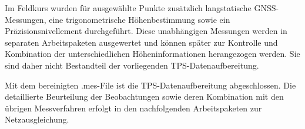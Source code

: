 Im Feldkurs wurden für ausgewählte Punkte zusätzlich langstatische
GNSS-Messungen, eine trigonometrische Höhenbestimmung sowie ein
Präzisionsnivellement durchgeführt. Diese unabhängigen Messungen werden
in separaten Arbeitspaketen ausgewertet und können später zur Kontrolle
und Kombination der unterschiedlichen Höheninformationen herangezogen
werden. Sie sind daher nicht Bestandteil der vorliegenden
TPS-Datenaufbereitung.

Mit dem bereinigten .mes-File ist die TPS-Datenaufbereitung
abgeschlossen. Die detaillierte Beurteilung der Beobachtungen sowie
deren Kombination mit den übrigen Messverfahren erfolgt in den
nachfolgenden Arbeitspaketen zur Netzausgleichung.